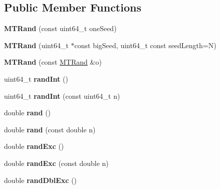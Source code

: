 \subsection*{Public Member Functions}
\begin{DoxyCompactItemize}
\item 
\hypertarget{classMTRand_a60104c123a240826273baafe99238c9f}{{\bfseries M\-T\-Rand} (const uint64\-\_\-t one\-Seed)}\label{classMTRand_a60104c123a240826273baafe99238c9f}

\item 
\hypertarget{classMTRand_a8e6fe5b4b8a3e07cc32530854dd114ec}{{\bfseries M\-T\-Rand} (uint64\-\_\-t $\ast$const big\-Seed, uint64\-\_\-t const seed\-Length=N)}\label{classMTRand_a8e6fe5b4b8a3e07cc32530854dd114ec}

\item 
\hypertarget{classMTRand_aff69d4a4ec88475bab03a295e8fb0f60}{{\bfseries M\-T\-Rand} (const \hyperlink{classMTRand}{M\-T\-Rand} \&o)}\label{classMTRand_aff69d4a4ec88475bab03a295e8fb0f60}

\item 
\hypertarget{classMTRand_ad36da78bd8155920a5cb7d85eaae0ade}{uint64\-\_\-t {\bfseries rand\-Int} ()}\label{classMTRand_ad36da78bd8155920a5cb7d85eaae0ade}

\item 
\hypertarget{classMTRand_a7b291ee28dbc624ca2d411f19c41d3e9}{uint64\-\_\-t {\bfseries rand\-Int} (const uint64\-\_\-t n)}\label{classMTRand_a7b291ee28dbc624ca2d411f19c41d3e9}

\item 
\hypertarget{classMTRand_a76d129a2d850c24ff4a0613f299cf3a5}{double {\bfseries rand} ()}\label{classMTRand_a76d129a2d850c24ff4a0613f299cf3a5}

\item 
\hypertarget{classMTRand_aa4fe82fc27fd81414ce7554093a9766b}{double {\bfseries rand} (const double n)}\label{classMTRand_aa4fe82fc27fd81414ce7554093a9766b}

\item 
\hypertarget{classMTRand_afd05e468983b3a3d66ce0f403bd666af}{double {\bfseries rand\-Exc} ()}\label{classMTRand_afd05e468983b3a3d66ce0f403bd666af}

\item 
\hypertarget{classMTRand_aa1e89d6c7ac8737567b3ccf8fe70b6de}{double {\bfseries rand\-Exc} (const double n)}\label{classMTRand_aa1e89d6c7ac8737567b3ccf8fe70b6de}

\item 
\hypertarget{classMTRand_a4d3a475aa72fe6d1a6d7d9e16d6a732e}{double {\bfseries rand\-Dbl\-Exc} ()}\label{classMTRand_a4d3a475aa72fe6d1a6d7d9e16d6a732e}


\end{DoxyCompactItemize}
